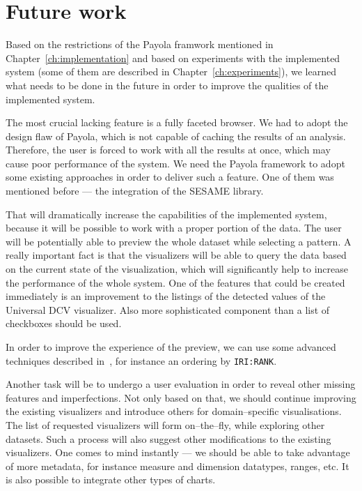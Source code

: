 \chapter{Future work}
\label{ch:future}

Based on the restrictions of the Payola framwork mentioned in Chapter~\ref{ch:implementation}
and based on experiments with the implemented system (some of them are described in
Chapter~\ref{ch:experiments}), we learned what needs to be done in the future in order to improve
the qualities of the implemented system.

The most crucial lacking feature is a fully faceted browser. We had to adopt the 
design flaw of Payola, which is not capable of caching the results of an analysis. 
Therefore, the user is forced to work with all the results at once, which may 
cause poor performance of the system. We need the Payola framework to adopt some 
existing approaches in order to deliver such a feature. One of them was 
mentioned before --- the integration of the SESAME library.

That will dramatically increase the capabilities of the implemented system, 
because it will be possible to work with a proper portion of the data. The user will 
be potentially able to preview the whole dataset while selecting a pattern. A 
really important fact is that the visualizers will be able to query the data 
based on the current state of the visualization, which will significantly help 
to increase the performance of the whole system. One of the features that could 
be created immediately is an improvement to the listings of the detected values of the 
Universal DCV visualizer. Also more sophisticated component than a list of 
checkboxes should be used.

In order to improve the experience of the preview, we can use some advanced 
techniques described in~\cite{faceted-ldow2009}, for instance an ordering by 
\texttt{IRI:RANK}.

Another task will be to undergo a user evaluation in order to reveal other 
missing features and imperfections. Not only based on that, we should continue 
improving the existing visualizers and introduce others for
domain--specific visualisations. The list of requested visualizers will form 
on--the--fly, while exploring other datasets. Such a process will also suggest 
other modifications to the existing visualizers. One comes to mind instantly --- we 
should be able to take advantage of more metadata, for instance measure and 
dimension datatypes, ranges, etc. It is also possible to integrate other types 
of charts.

